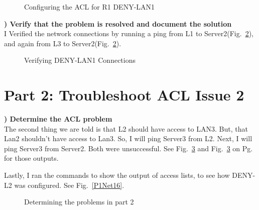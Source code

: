 \documentclass{report}
\newcommand{\mysection}[1]{\section*{#1}}
\newcommand{\mysubsection}[2]{\textbf{\romannumeral #1) #2}}
\begin{document}
\begin{figure}[!hbt]\centering
{}\hfill
{}\par 
{}
\caption{Configuring the ACL for R1 DENY-LAN1}\label{P1Config16}
\end{figure}



\noindent\mysubsection{3}{Verify that the problem is resolved and document the
solution}\\
I Verified the network connections by running a ping from L1 to
Server2(Fig.~\ref{P1Verify16}), and
again from L3 to Server2(Fig.~\ref{P1Verify16}).


\begin{figure}[!hbt]\centering
{}\hfill
{}\par 
\caption{Verifying DENY-LAN1 Connections}\label{P1Verify16}
\end{figure}


\clearpage

\mysection{\textbf{Part 2: Troubleshoot ACL Issue 2}}


\mysubsection{1}{Determine the ACL problem}\\
The second thing we are told is that L2 should have access to LAN3. But, that 
Lan2 shouldn't have access to Lan3.  So, I will ping Server3 from L2. 
Next, I will ping Server3 from Server2. Both were unsuccessful. See Fig.~\ref{P2Net16} 
and Fig.~\ref{P2Net16}
on Pg.~\pageref{P2Net16} for those outputs.


Lastly, I ran the commands to show the output of access lists, 
to see how DENY-L2 was configured. See Fig.~\ref{P1Net16}.


\begin{figure}[!hbt]\centering
{}\hfill
{}\par 
{}
\caption{Determining the problems in part 2}\label{P2Net16}
\end{figure}
\end{document}
